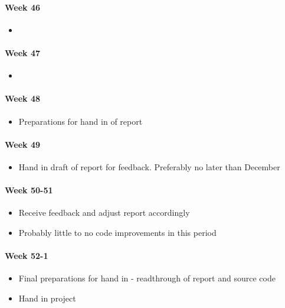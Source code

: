 \paragraph{Week 46}
\begin{itemize}
    \item 
\end{itemize}
\paragraph{Week 47}
\begin{itemize}
    \item 
\end{itemize}
\paragraph{Week 48}
\begin{itemize}
    \item Preparations for hand in of report
\end{itemize}
\paragraph{Week 49}
\begin{itemize}
    \item Hand in draft of report for feedback. Preferably no later than  December
\end{itemize}
\paragraph{Week 50-51}
\begin{itemize}
    \item Receive feedback and adjust report accordingly
    \item Probably little to no code improvements in this period
\end{itemize}
\paragraph{Week 52-1}
\begin{itemize}
    \item Final preparations for hand in - readthrough of report and source code
    \item Hand in project
\end{itemize}